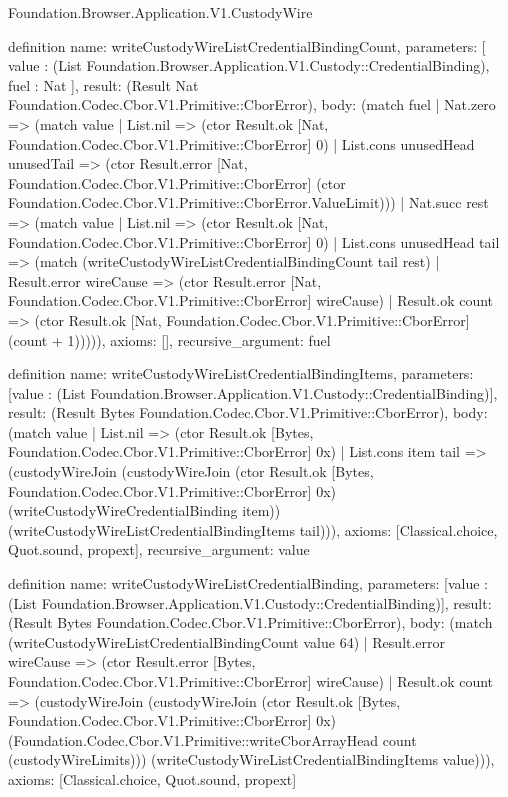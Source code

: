 \begin{lexlean}{Foundation.Browser.Application.V1.CustodyWire}
\begin{semanticmodule}
definition{
  name: writeCustodyWireListCredentialBindingCount,
  parameters: [
    value : (List Foundation.Browser.Application.V1.Custody::CredentialBinding),
    fuel : Nat
  ],
  result: (Result Nat Foundation.Codec.Cbor.V1.Primitive::CborError),
  body: (match fuel
    | Nat.zero => (match value
      | List.nil => (ctor Result.ok [Nat, Foundation.Codec.Cbor.V1.Primitive::CborError] 0)
      | List.cons unusedHead unusedTail => (ctor Result.error [Nat, Foundation.Codec.Cbor.V1.Primitive::CborError] (ctor Foundation.Codec.Cbor.V1.Primitive::CborError.ValueLimit)))
    | Nat.succ rest => (match value
      | List.nil => (ctor Result.ok [Nat, Foundation.Codec.Cbor.V1.Primitive::CborError] 0)
      | List.cons unusedHead tail => (match (writeCustodyWireListCredentialBindingCount tail rest)
        | Result.error wireCause => (ctor Result.error [Nat, Foundation.Codec.Cbor.V1.Primitive::CborError] wireCause)
        | Result.ok count => (ctor Result.ok [Nat, Foundation.Codec.Cbor.V1.Primitive::CborError] (count + 1))))),
  axioms: [],
  recursive_argument: fuel
}

definition{
  name: writeCustodyWireListCredentialBindingItems,
  parameters: [value : (List Foundation.Browser.Application.V1.Custody::CredentialBinding)],
  result: (Result Bytes Foundation.Codec.Cbor.V1.Primitive::CborError),
  body: (match value
    | List.nil => (ctor Result.ok [Bytes, Foundation.Codec.Cbor.V1.Primitive::CborError] 0x)
    | List.cons item tail => (custodyWireJoin (custodyWireJoin (ctor Result.ok [Bytes, Foundation.Codec.Cbor.V1.Primitive::CborError] 0x) (writeCustodyWireCredentialBinding item)) (writeCustodyWireListCredentialBindingItems tail))),
  axioms: [Classical.choice, Quot.sound, propext],
  recursive_argument: value
}

definition{
  name: writeCustodyWireListCredentialBinding,
  parameters: [value : (List Foundation.Browser.Application.V1.Custody::CredentialBinding)],
  result: (Result Bytes Foundation.Codec.Cbor.V1.Primitive::CborError),
  body: (match (writeCustodyWireListCredentialBindingCount value 64)
    | Result.error wireCause => (ctor Result.error [Bytes, Foundation.Codec.Cbor.V1.Primitive::CborError] wireCause)
    | Result.ok count => (custodyWireJoin (custodyWireJoin (ctor Result.ok [Bytes, Foundation.Codec.Cbor.V1.Primitive::CborError] 0x) (Foundation.Codec.Cbor.V1.Primitive::writeCborArrayHead count (custodyWireLimits))) (writeCustodyWireListCredentialBindingItems value))),
  axioms: [Classical.choice, Quot.sound, propext]
}


\end{semanticmodule}
\end{lexlean}
